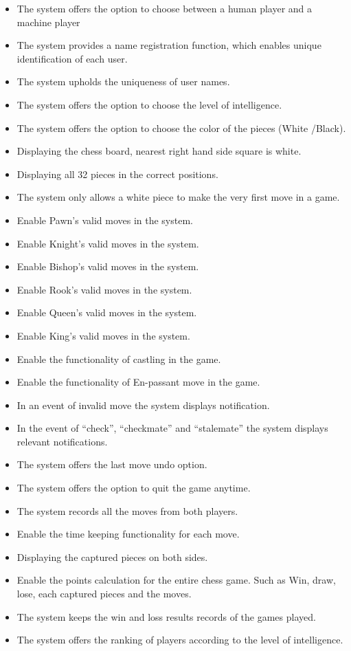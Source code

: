 \documentclass{article}
\begin{document}
\begin{flushleft}
\begin{itemize}
	\item The system offers the option to choose between a human player and a machine player
	\item The system provides a name registration function, which enables unique identification of each user. 
	\item The system upholds the uniqueness of user names. 
	\item The system offers the option to choose the level of intelligence.
	\item The system offers the option to choose the color of the pieces (White /Black).
	\item Displaying the chess board, nearest right hand side square is white.
	\item Displaying all 32 pieces in the correct positions.
	\item The system only allows a white piece to make the very first move in a game.
	\item Enable Pawn’s valid moves in the system.
	\item Enable Knight’s valid moves in the system.
	\item Enable Bishop’s valid moves in the system.
	\item Enable Rook’s valid moves in the system.
	\item Enable Queen’s valid moves in the system.
	\item Enable King’s valid moves in the system.
	\item Enable the functionality of castling in the game.
	\item Enable the functionality of En-passant move in the game.
	\item In an event of invalid move the system displays notification.
	\item In the event of “check”, “checkmate” and “stalemate” the system displays relevant notifications.
	\item The system offers the last move undo option.
	\item The system offers the option to quit the game anytime.   
	\item The system records all the moves from both players.
	\item Enable the time keeping functionality for each move.
	\item Displaying the captured pieces on both sides.
	\item Enable the points calculation for the entire chess game. Such as Win, draw, lose, each captured pieces and the moves.	
	\item The system keeps the win and loss results records of the games played.
	\item The system offers the ranking of players according to the level of intelligence. 
\end{itemize}


\end{flushleft}
\end{document}
